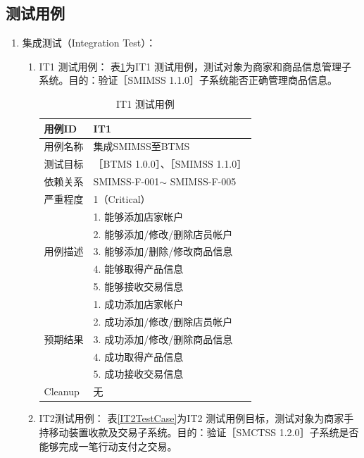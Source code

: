 		\subsection{测试用例}
			\begin{enumerate}

			\item 集成测试（Integration Test）：
				\begin{enumerate}

				\item IT1 测试用例：
					表\ref{IT1TestCase}为IT1 测试用例，测试对象为商家和商品信息管理子系统。目的：验证［SMIMSS 1.1.0］子系统能否正确管理商品信息。

					\begin{table}[!htbp]
					\centering
					\caption{IT1 测试用例}
					\label{IT1TestCase}
					\begin{tabular}{|l|l|}
					\hline
					用例ID & IT1 \\ \hline
					用例名称 & 集成SMIMSS至BTMS \\ \hline
					测试目标 & {［}BTMS 1.0.0{］}、{［}SMIMSS 1.1.0{］} \\ \hline
					依赖关系 & SMIMSS-F-001$\sim$ SMIMSS-F-005 \\ \hline
					严重程度 & 1（Critical） \\ \hline
					\multirow{5}{*}{用例描述} & 1.     能够添加店家帐户 \\ \cline{2-2} 
					 & 2.     能够添加/修改/删除店员帐户 \\ \cline{2-2} 
					 & 3.     能够添加/删除/修改商品信息 \\ \cline{2-2} 
					 & 4.     能够取得产品信息 \\ \cline{2-2} 
					 & 5.     能够接收交易信息 \\ \hline
					\multirow{5}{*}{预期结果} & 1.     成功添加店家帐户 \\ \cline{2-2} 
					 & 2.     成功添加/修改/删除店员帐户 \\ \cline{2-2} 
					 & 3.     成功添加/修改/删除商品信息 \\ \cline{2-2} 
					 & 4.     成功取得产品信息 \\ \cline{2-2} 
					 & 5.     成功接收交易信息 \\ \hline
					Cleanup & 无 \\ \hline
					\end{tabular}
					\end{table}


				\item IT2测试用例：
					表\ref{IT2TestCase}为IT2 测试用例目标，测试对象为商家手持移动装置收款及交易子系统。目的：验证［SMCTSS 1.2.0］子系统是否能够完成一笔行动支付之交易。


\end{enumerate}
\end{enumerate}
